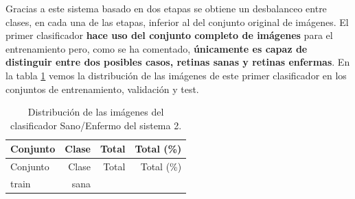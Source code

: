 \documentclass[
  12pt,
  spanish,
  a4paperpaper,
]{report}
\begin{document}
Gracias a este sistema basado en dos etapas se obtiene un desbalanceo
entre clases, en cada una de las etapas, inferior al del conjunto
original de imágenes. El primer clasificador \textbf{hace uso del
conjunto completo de imágenes} para el entrenamiento pero, como se ha
comentado, \textbf{únicamente es capaz de distinguir entre dos posibles
casos, retinas sanas y retinas enfermas}. En la tabla \ref{c1s2} vemos
la distribución de las imágenes de este primer clasificador en los
conjuntos de entrenamiento, validación y test.

\begin{longtable}[]{@{}lrrr@{}}
\caption{Distribución de las imágenes del clasificador Sano/Enfermo del
sistema 2. \label{c1s2}}\tabularnewline
\toprule
\begin{minipage}[b]{0.14\columnwidth}\raggedright
Conjunto\strut
\end{minipage} & \begin{minipage}[b]{0.20\columnwidth}\raggedleft
Clase\strut
\end{minipage} & \begin{minipage}[b]{0.18\columnwidth}\raggedleft
Total\strut
\end{minipage} & \begin{minipage}[b]{0.18\columnwidth}\raggedleft
Total (\%)\strut
\end{minipage}\tabularnewline
\midrule
\endfirsthead
\toprule
\begin{minipage}[b]{0.14\columnwidth}\raggedright
Conjunto\strut
\end{minipage} & \begin{minipage}[b]{0.20\columnwidth}\raggedleft
Clase\strut
\end{minipage} & \begin{minipage}[b]{0.18\columnwidth}\raggedleft
Total\strut
\end{minipage} & \begin{minipage}[b]{0.18\columnwidth}\raggedleft
Total (\%)\strut
\end{minipage}\tabularnewline
\midrule
\endhead
\begin{minipage}[t]{0.14\columnwidth}\raggedright
train\strut
\end{minipage} & \begin{minipage}[t]{0.20\columnwidth}\raggedleft
sana\strut
\end{minipage} & \begin{minipage}[t]{0.18\columnwidth}\raggedleft
17610\strut
\end{minipage} & \begin{minipage}[t]{0.18\columnwidth}\raggedleft

\end{minipage}
\end{longtable}
\end{document}
